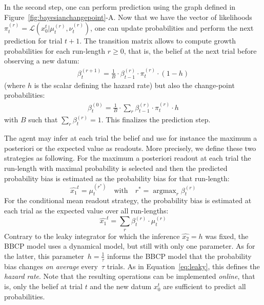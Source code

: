\documentclass[12pt,english]{article}%
\newcommand{\eql}[1]{\begin{equation}#1\end{equation}}
\newcommand{\eqa}[1]{\begin{align}#1\end{align}}
\DeclareMathOperator{\argmax}{argmax}
\newcommand{\Ll}{\mathcal{L}}
\newcommand{\seeFig}[1]{Figure~\ref{fig:#1}}
\newcommand{\seeEq}[1]{Equation~\ref{eq:#1}}
\begin{document}
In the second step, one can perform prediction
using the graph defined in \seeFig{bayesianchangepoint}-A.
Now that we have the vector of likelihoods $\pi^{(r)}_t=\Ll(x_0^t |  \mu^{(r)}_{t}, \nu^{(r)}_{t})$,
one can update probabilities and perform the next prediction for trial $t+1$.
The transition matrix %
allows to compute growth probabilities for each run-length $r \geq 0$, 
that is, the belief at the next trial before observing a new datum:
\eqa{
\beta^{(r+1)}_t = \frac{1}{B} \cdot \beta^{(r)}_{t-1} \cdot \pi^{(r)}_{t} \cdot (1-h)
}
(where $h$ is the scalar defining the hazard rate)
but also the change-point probabilities:
\eqa{
\beta^{(0)}_t  = \frac{1}{B} \cdot \sum_{r} \beta^{(r)}_{t-1} \cdot \pi^{(r)}_{t} \cdot h
}
with $B$ such that $\sum_{r} \beta^{(r)}_{t} = 1$.
This finalizes the prediction step.

The agent may infer at each trial the belief
and use for instance the maximum a posteriori or the expected value as readouts.
More precisely, we define these two strategies as following.
For the maximum a posteriori readout
at each trial the run-length with maximal probability is selected
and then the predicted probability bias is estimated
as the probability bias for that run-length:
\eql{
\hat{x_1}^t = \mu^{(r^\ast)}_{t} \quad \text{with} \quad r^\ast = \argmax_r \beta^{(r)}_{t}
}
For the conditional mean readout strategy, the probability bias is estimated
at each trial as the expected value over all run-lengths:
\eql{
\hat{x_1}^t = \sum_{r} \beta^{(r)}_{t} \cdot \mu^{(r)}_{t}
}
Contrary to the leaky integrator for which the inference $\hat{x_2}=h$ was fixed,
the BBCP model uses a dynamical model, but still with only one parameter.
As for the latter, this parameter~$h=\frac 1 \tau$ informs the BBCP model
that the probability bias  changes \emph{on average} every~$\tau$ trials.
As in \seeEq{leaky}, this defines the \emph{hazard rate}.
Note that the resulting operations can be implemented \textit{online}, that is,
only the belief at trial $t$ and the new datum $x_0^t$
are sufficient to predict all probabilities.
\end{document}
